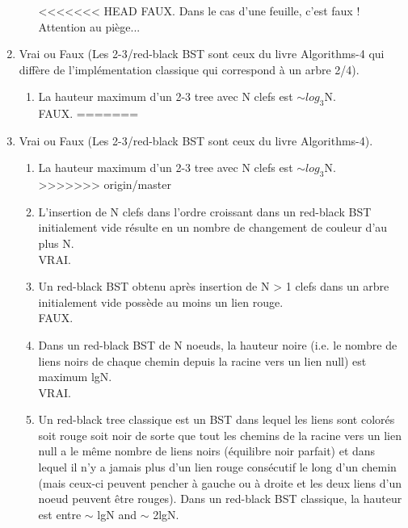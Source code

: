 \documentclass[11pt]{article}
\begin{document}
\begin{enumerate}
\begin{enumerate}
<<<<<<< HEAD
{\color{dkgreen}FAUX.} Dans le cas d'une feuille, c'est faux ! Attention au piège... 
\end{enumerate}

\item Vrai ou Faux (Les 2-3/red-black BST sont ceux du livre Algorithms-4 qui diffère de l'implémentation classique qui correspond à un arbre 2/4).
\begin{enumerate}
\item La hauteur maximum d'un 2-3 tree avec N clefs est $\sim log_3$N.\\

{\color{dkgreen}FAUX.}
=======
\end{enumerate}
\item Vrai ou Faux (Les 2-3/red-black BST sont ceux du livre Algorithms-4).
\begin{enumerate}
\item La hauteur maximum d'un 2-3 tree avec N clefs est $\sim log_3$N.\\

>>>>>>> origin/master

\item L'insertion de N clefs dans l'ordre croissant dans un red-black BST initialement
vide résulte en un nombre de changement de couleur d'au plus N.\\

{\color{dkgreen}VRAI.}

\item Un red-black BST obtenu après insertion de N > 1 clefs dans un arbre initialement
vide possède au moins un lien rouge.\\

{\color{dkgreen}FAUX.}


\item Dans un red-black BST de N noeuds, la hauteur noire (i.e. le nombre de liens
noirs de chaque chemin depuis la racine vers un lien null) est maximum lgN.\\

{\color{dkgreen}VRAI.}

\item Un red-black tree classique est un BST dans lequel les liens sont colorés soit
rouge soit noir de sorte que tout les chemins de la racine vers un lien null a
le même nombre de liens noirs (équilibre noir parfait) et dans lequel il n'y
a jamais plus d'un lien rouge consécutif le long d'un chemin (mais ceux-ci
peuvent pencher à gauche ou à droite et les deux liens d'un noeud peuvent
être rouges). Dans un red-black BST classique, la hauteur est entre $\sim$ lgN
and $\sim$ 2lgN.\\


\end{enumerate}
\end{enumerate}
\end{document}
